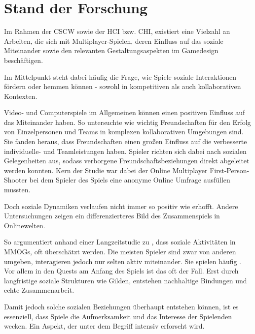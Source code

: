 \chapter{Stand der Forschung}\label{sec:related-works}

Im Rahmen der \ac{CSCW} sowie der \ac{HCI} bzw. \ac{CHI}, existiert eine Vielzahl an Arbeiten, die sich mit Multiplayer-Spielen, deren Einfluss auf das soziale Miteinander sowie den relevanten Gestaltungsaspekten im Gamedesign beschäftigen.

Im Mittelpunkt steht dabei häufig die Frage, wie Spiele soziale Interaktionen fördern oder hemmen können - sowohl in kompetitiven als auch kollaborativen Kontexten.

Video- und Computerspiele im Allgemeinen können einen positiven Einfluss auf das Miteinander haben. So untersuchte \cite{mason_friends_2013} wie wichtig Freundschaften für den Erfolg von Einzelpersonen und Teams in komplexen kollaborativen Umgebungen sind. Sie fanden heraus, dass Freundschaften einen großen Einfluss auf die verbesserte individuelle- und Teamleistungen haben. Spieler richten sich dabei nach sozialen Gelegenheiten aus, sodass verborgene Freundschaftsbeziehungen direkt abgeleitet werden konnten. Kern der Studie war dabei der Online Multiplayer First-Person-Shooter  bei dem Spieler des Spiels eine anonyme Online Umfrage ausfüllen mussten. 

Doch soziale Dynamiken verlaufen nicht immer so positiv wie erhofft. Andere Untersuchungen zeigen ein differenzierteres Bild des Zusammenspiels in Onlinewelten.

So argumentiert \cite{ducheneaut_alone_2006} anhand einer Langzeitstudie zu , dass soziale Aktivitäten in \ac{MMOG}s, oft überschätzt werden. Die meisten Spieler sind zwar von anderen umgeben, interagieren jedoch nur selten aktiv miteinander. Sie spielen häufig . Vor allem in den Quests am Anfang des Spiels ist das oft der Fall. Erst durch langfristige soziale Strukturen wie Gilden, entstehen nachhaltige Bindungen und echte Zusammenarbeit.

Damit jedoch solche sozialen Beziehungen überhaupt entstehen können, ist es essenziell, dass Spiele die Aufmerksamkeit und das Interesse der Spielenden wecken. Ein Aspekt, der unter dem Begriff  intensiv erforscht wird.

